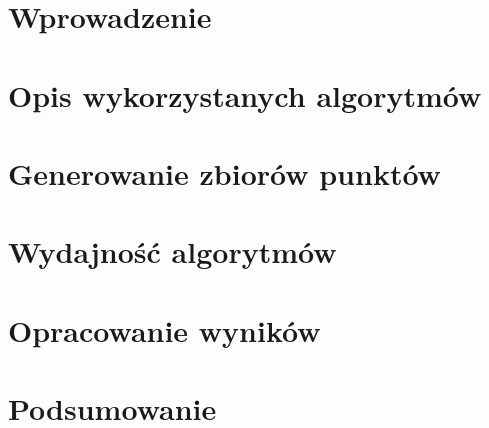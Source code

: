 \documentclass{sprawozdanie-agh}
\begin{document}

\stronatytulowa{}

\section{Wprowadzenie}

\section{Opis wykorzystanych algorytmów}



\section{Generowanie zbiorów punktów}



\section{Wydajność algorytmów}




\section{Opracowanie wyników}
\section{Podsumowanie}

\end{document}

